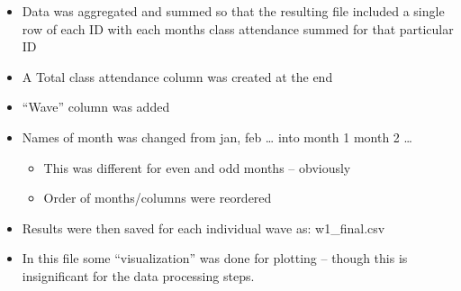 \documentclass[
]{book}
\providecommand{\tightlist}{%
  \setlength{\itemsep}{0pt}\setlength{\parskip}{0pt}}
\begin{document}
\begin{itemize}
\tightlist
\item
  Data was aggregated and summed so that the resulting file included a single row of each ID with each months class attendance summed for that particular ID
\item
  A Total class attendance column was created at the end
\item
  ``Wave'' column was added
\item
  Names of month was changed from jan, feb \ldots{} into month 1 month 2 \ldots{}

  \begin{itemize}
  \tightlist
  \item
    This was different for even and odd months -- obviously
  \item
    Order of months/columns were reordered
  \end{itemize}
\item
  Results were then saved for each individual wave as: w1\_final.csv
\item
  In this file some ``visualization'' was done for plotting -- though this is insignificant for the data processing steps.
\end{itemize}
\end{document}
